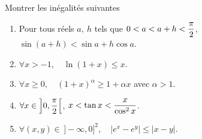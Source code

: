 \documentclass[a4paper, 11pt,reqno]{article}
\begin{document}
\begin{exercice}  \;
	Montrer les in\'egalit\'es suivantes
	\begin{enumerate}
		\item Pour tous r\'eels $a,\ h$ tels que $0<a<a+h<\displaystyle\frac{\pi}{2}$, $\sin{(a+h)}<\sin{a}+h\cos{a}$.
		\item $\forall x>-1,\quad \ln{(1+x)}\leq x$.
		\item $\forall x\geq 0,\quad (1+x)^{\alpha}\geq 1+\alpha x$ avec $\alpha >1$.
		\item $\forall x\in\left\rbrack 0,\displaystyle\frac{\pi}{2}\right\lbrack$, $x<\tan{x}<\displaystyle\frac{x}{\cos^2{x}}$.
		\item $\forall (x,y)\in \, \rbrack -\infty,0\rbrack^2,\quad |e^x-e^y|\leq |x-y|$.
	\end{enumerate}
\end{exercice}
\end{document}
